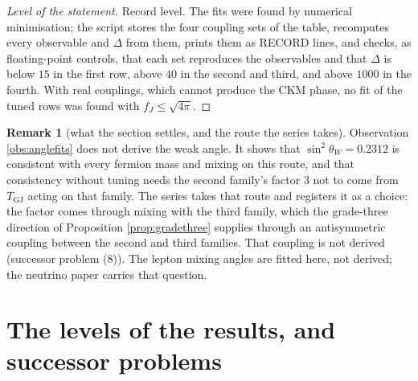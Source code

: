 \documentclass[11pt]{article}
\theoremstyle{definition}
\newtheorem{remark}[theorem]{Remark}
\begin{document}
\begin{proof}[Level of the statement]
Record level. The fits were found by numerical minimisation; the script stores the four coupling sets of the table, recomputes every observable and $\Delta$ from them, prints them as RECORD lines, and checks, as floating-point controls, that each set reproduces the observables and that $\Delta$ is below $15$ in the first row, above $40$ in the second and third, and above $1000$ in the fourth. With real couplings, which cannot produce the CKM phase, no fit of the tuned rows was found with $f_{J} \le \sqrt{4\pi}$.
\end{proof}

\begin{remark}[what the section settles, and the route the series takes]\label{rem:anglestatus}
Observation \ref{obs:anglefits} does not derive the weak angle. It shows that $\sin^{2}\theta_{W} = 0.2312$ is consistent with every fermion mass and mixing on this route, and that consistency without tuning needs the second family's factor $3$ not to come from $T_{\mathrm{GJ}}$ acting on that family. The series takes that route and registers it as a choice: the factor comes through mixing with the third family, which the grade-three direction of Proposition \ref{prop:gradethree} supplies through an antisymmetric coupling between the second and third families. That coupling is not derived (successor problem (8)). The lepton mixing angles are fitted here, not derived; the neutrino paper carries that question.
\end{remark}


\section{The levels of the results, and successor problems}\label{sec:ledger}
\end{document}
